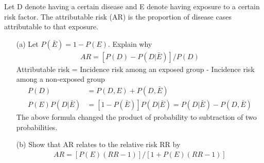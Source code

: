 \documentclass{homework}
\begin{document}
Let D denote having a certain disease and E denote having exposure to a certain risk factor. The attributable risk (AR) is the proportion of disease cases attributable to that exposure.\\
\begin{itemize}
    \item [(a)] Let $P(\bar{E}) = 1-P(E)$. Explain why 
\begin{align*}
     AR = [P(D) - P(D|\bar{E})]/P(D)
\end{align*}
Attributable risk = Incidence risk among an exposed group - Incidence risk among a non-exposed group\\
\begin{align*}
     P(D) &= P(D, E) + P(D, \bar{E})\\
     P(E)P(D|\bar{E}) &= [1-P(\bar{E})]P(D|\bar{E}) = P(D|\bar{E}) - P(D, \bar{E})
\end{align*}
The above formula changed the product of probability to subtraction of two probabilities.\\

\item [(b)] Show that AR relates to the relative risk RR by  
    \begin{align*}
     AR = [P(E)(RR-1)]/[1+ P(E)(RR-1)]\\
\end{align*}
\end{itemize}
\end{document}

